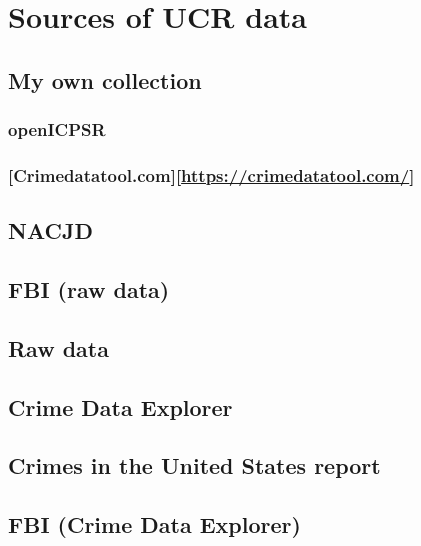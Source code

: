\documentclass[
]{krantz}
\begin{document}
\section{Sources of UCR data}\label{sources-of-ucr-data}

\subsection{My own collection}\label{my-own-collection}

\subsubsection{openICPSR}\label{openicpsr}

\subsubsection{\texorpdfstring{{[}Crimedatatool.com{]}{[}\url{https://crimedatatool.com/}{]}}{{[}Crimedatatool.com{]}{[}https://crimedatatool.com/{]}}}\label{crimedatatool.comhttpscrimedatatool.com}

\subsection{NACJD}\label{nacjd}

\subsection{FBI (raw data)}\label{fbi-raw-data}

\subsection{Raw data}\label{raw-data}

\subsection{Crime Data Explorer}\label{crime-data-explorer}

\subsection{Crimes in the United States
report}\label{crimes-in-the-united-states-report}

\subsection{FBI (Crime Data
Explorer)}\label{fbi-crime-data-explorer}
\end{document}
